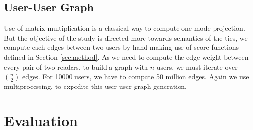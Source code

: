 \documentclass[11pt]{article}
\begin{document}
\subsection{User-User Graph}
Use of matrix multiplication is a classical way to compute one mode projection. But the objective of the study is directed more towards semantics of the ties, we compute each edges between two users by hand making use of score functions defined in Section \ref{sec:method}. As we need to compute the edge weight between every pair of two readers, to build a graph with $n$ users, we must iterate over $n \choose 2$ edges. For 10000 users, we have to compute 50 million edges. Again we use multiprocessing, to expedite this user-user graph generation.


\section{Evaluation}
\end{document}
